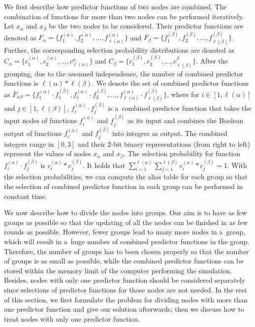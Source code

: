 \documentclass[runningheads,a4paper]{llncs}
\begin{document}
We first describe how predictor functions of two nodes are combined.
The combination of functions for more than two nodes can be performed iteratively.
Let $x_{\alpha}$ and $x_{\beta}$ be the two nodes to be considered.
Their predictor functions are denoted as
$F_{\alpha}=\{f_1^{({\alpha})}, f_2^{({\alpha})}, \dots, f_{\ell({\alpha})}^{({\alpha})}\}$
and $F_{\beta}=\{f_1^{({\beta})}, f_2^{({\beta})}, \dots, f_{\ell(\beta)}^{({\beta})}\}$.
Further, the corresponding selection probability distributions are denoted as
$C_{\alpha}=\{c_1^{({\alpha})}, c_2^{({\alpha})}, \dots, c_{\ell(\alpha)}^{{\alpha}}\}$
and $C_{\beta}=\{c_1^{({\beta})}, c_2^{({\beta})}, \dots, c_{\ell({\beta})}^{{\beta}}\}$.
After the grouping, due to the assumed independence, the number of combined predictor functions
is  $\ell(\alpha) * \ell(\beta).$ We denote the set of combined predictor functions as
$\bar{F}_{\alpha\beta}=
\{f_1^{({\alpha})}\cdot f_1^{({\beta})}, f_1^{({\alpha})}\cdot f_2^{({\beta})}, \dots, f_{\ell({\alpha})}^{({\alpha})}\cdot f_{\ell({\beta})}^{({\beta})}\}$,
where for $i \in [1,\ell(\alpha)]$ and $j \in [1,\ell(\beta)]$,
$f_i^{({\alpha})}\cdot f_j^{({\beta})}$ is a~combined predictor function
that takes the input nodes of functions $f_i^{({\alpha})}$ and $f_j^{({\beta})}$ as its input and
combines the Boolean output of functions $f_i^{({\alpha})}$ and $f_j^{({\beta})}$ into integers as output.
The combined integers range in $[0,3]$ and their 2-bit binary representations (from right to left) represent the values of nodes $x_{\alpha}$ and $x_{\beta}$.
The selection probability for function $f_i^{({\alpha})}\cdot f_j^{({\beta})}$ is $c_i^{(\alpha)}*c_j^{(\beta)}$.
It holds that $\sum_{i=1}^{\ell(\alpha)}\sum_{j=1}^{\ell(\beta)}c_i^{(\alpha)}*c_j^{(\beta)}=1$.
With the selection probabilities, we can compute the alias table for each group so that the
selection of combined predictor function in each group can be performed in constant time.

We now describe how to divide the nodes into groups.
Our aim is to have as few groups as possible so that the updating
of all the nodes can be finished in as few rounds as possible.
However, fewer groups lead to many more nodes in a~group,
which will result in a~huge number of combined predictor functions in the group.
Therefore, the number of groups has to been chosen properly so that
the number of groups is as small as possible,
while the combined predictor functions can be stored within the memory limit
of the computer performing the simulation.
Besides, nodes with only one predictor function should be considered separately
since selections of predictor functions for those nodes are not needed.
In the rest of this section,
we first formulate the problem for dividing nodes with more than one predictor function
and give our solution afterwards;
then we discuss how to treat nodes with only one predictor function.
\end{document}
